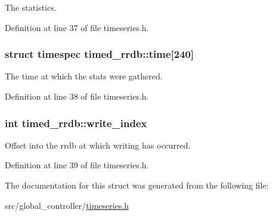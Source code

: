 The statistics. 



Definition at line 37 of file timeseries.\-h.

\hypertarget{structtimed__rrdb_abcf16b68b8b0bb8eb6a3c1e266b4c2f8}{
\subsubsection[{time}]{\setlength{\rightskip}{0pt plus 5cm}struct timespec timed\-\_\-rrdb\-::time\mbox{[}240\mbox{]}}}\label{structtimed__rrdb_abcf16b68b8b0bb8eb6a3c1e266b4c2f8}


The time at which the stats were gathered. 



Definition at line 38 of file timeseries.\-h.

\hypertarget{structtimed__rrdb_ab0c1ce0ef397283f1f93ed5d03583bab}{
\subsubsection[{write\-\_\-index}]{\setlength{\rightskip}{0pt plus 5cm}int timed\-\_\-rrdb\-::write\-\_\-index}}\label{structtimed__rrdb_ab0c1ce0ef397283f1f93ed5d03583bab}


Offset into the rrdb at which writing has occurred. 



Definition at line 39 of file timeseries.\-h.



The documentation for this struct was generated from the following file\-:\begin{DoxyCompactItemize}
\item 
src/global\-\_\-controller/\hyperlink{timeseries_8h}{timeseries.\-h}\end{DoxyCompactItemize}
